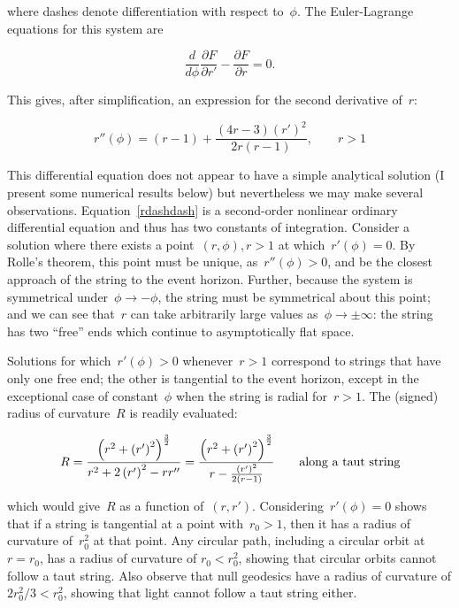\documentclass[prb,preprint]{revtex4-1}
\begin{document}
where dashes denote differentiation with respect to~$\phi$.  The
Euler-Lagrange equations for this system are

\begin{equation}
  \frac{d}{d\phi}\frac{\partial F}{\partial r'}-\frac{\partial F}{\partial r}=0.
\end{equation}

This gives, after simplification, an expression for the second
derivative of~$r$:

\begin{equation}\label{rdashdash}
  r''\left(\phi\right) =
  (r-1) + \frac{(4r-3)\left(r'\right)^2}{2r\left(r-1\right)},\qquad r>1
\end{equation}

This differential equation does not appear to have a simple analytical
solution (I present some numerical results below) but nevertheless we
may make several observations.  Equation~\ref{rdashdash} is a
second-order nonlinear ordinary differential equation and thus has two
constants of integration.  Consider a solution where there exists a
point~$\left(r,\phi\right), r>1$ at which~$r'(\phi)=0$.  By Rolle's
theorem, this point must be unique, as~$r''(\phi)>0$, and be the
closest approach of the string to the event horizon.  Further, because
the system is symmetrical under~$\phi\longrightarrow-\phi$, the string
must be symmetrical about this point; and we can see that~$r$ can take
arbitrarily large values as~$\phi\longrightarrow\pm\infty$: the string
has two ``free'' ends which continue to asymptotically flat space.

Solutions for which~$r'(\phi)>0$ whenever~$r>1$ correspond to strings
that have only one free end; the other is tangential to the event
horizon, except in the exceptional case of constant~$\phi$ when the
string is radial for~$r>1$.  The (signed) radius of curvature~$R$ is
readily evaluated:

\begin{equation}\label{roc}
  R = \frac{
    \left(r^2 + \left(r'\right)^2\right)^\frac{3}{2}
  }{
    r^2 + 2\left(r'\right)^2-rr''
  }
  =
  \frac{
    \left(r^2 + \left(r'\right)^2\right)^\frac{3}{2}
  }{
    r-\frac{\left(r'\right)^2}{2\left(r-1\right)}
  }\qquad\mbox{along a taut string}
\end{equation}

which would give~$R$ as a function of~$\left(r,r'\right)$.
Considering~$r'(\phi)=0$ shows that if a string is tangential at a
point with~$r_0>1$, then it has a radius of curvature of~$r_0^2$ at
that point.  Any circular path, including a circular orbit at~$r=r_0$,
has a radius of curvature of $r_0<r_0^2$, showing that circular orbits
cannot follow a taut string.  Also observe that null geodesics have a
radius of curvature of $2r_0^2/3 < r_0^2$, showing that light cannot
follow a taut string either.
\end{document}
